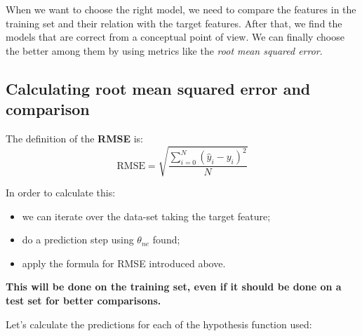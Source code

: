 \documentclass[11pt]{article}
\begin{document}
When we want to choose the right model, we need to compare the features in the training set and their relation with the target features. After that, we find the models that are correct from a conceptual point of view. We can finally choose the better among them by using metrics like the \textit{root mean squared error}.

\hypertarget{calculating-root-mean-squared-error-and-comparison}{%
\subsection{Calculating root mean squared error and
comparison}\label{calculating-root-mean-squared-error-and-comparison}}

The definition of the \textbf{RMSE} is:
\[ \text{RMSE} = \sqrt{\frac{\sum_{i=0}^N(\hat{y}_i-y_i)^2}{N}} \]

In order to calculate this:
\begin{itemize}
    \item we can iterate over the data-set taking the target feature;
    \item do a prediction step using \(\theta_{ne}\) found;
    \item apply the formula for RMSE introduced above.
\end{itemize}

\textbf{This will be done on the training set, even if it should be done
on a test set for better comparisons.}

Let's calculate the predictions for each of the hypothesis function used:
\end{document}
